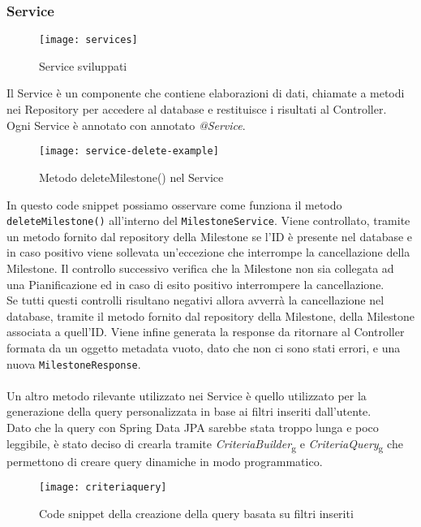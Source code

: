 \subsubsection{Service}
\begin{figure}[H] 
    \centering 
    \texttt{[image: services]} 
    \caption{Service sviluppati}
\end{figure}
Il Service è un componente che contiene elaborazioni di dati, chiamate a metodi nei Repository per accedere al database e restituisce i risultati al Controller.\\
Ogni Service è annotato con annotato \textit{@Service}.\\
\begin{figure}[H] 
    \centering 
    \texttt{[image: service-delete-example]} 
    \caption{Metodo deleteMilestone() nel Service}
\end{figure}
\noindent In questo code snippet possiamo osservare come funziona il metodo \texttt{deleteMilestone()} all'interno del \texttt{MilestoneService}. Viene controllato, tramite un metodo fornito dal repository della Milestone se l'ID è presente nel database e in caso positivo viene sollevata un'eccezione che interrompe la cancellazione della Milestone. Il controllo successivo verifica che la Milestone non sia collegata ad una Pianificazione ed in caso di esito positivo interrompere la cancellazione.\\
Se tutti questi controlli risultano negativi allora avverrà la cancellazione nel database, tramite il metodo fornito dal repository della Milestone, della Milestone associata a quell'ID. Viene infine generata la response da ritornare al Controller formata da un oggetto metadata vuoto, dato che non ci sono stati errori, e una nuova \texttt{MilestoneResponse}.\\\\
Un altro metodo rilevante utilizzato nei Service è quello utilizzato per la generazione della query personalizzata in base ai filtri inseriti dall'utente.\\
Dato che la query con Spring Data JPA sarebbe stata troppo lunga e poco leggibile, è stato deciso di crearla tramite \textit{CriteriaBuilder}\textsubscript{g} e \textit{CriteriaQuery}\textsubscript{g} che permettono di creare query dinamiche in modo programmatico.
\begin{figure}[H] 
    \centering 
    \texttt{[image: criteriaquery]} 
    \caption{Code snippet della creazione della query basata su filtri inseriti}
\end{figure}
